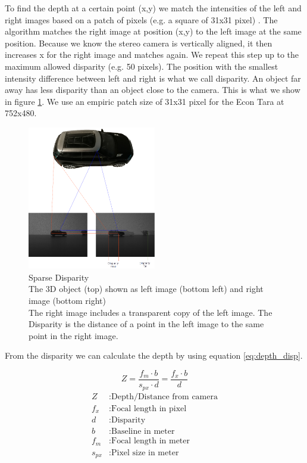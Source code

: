 \documentclass[11pt,a4paper,titlepage,oneside]{report}
\begin{document}
To find the depth at a certain point (x,y) we match the intensities of the left and right images based on a patch of pixels (e.g. a square of 31x31 pixel) \cite{rvc}. The algorithm matches the right image at position (x,y) to the left image at the same position. Because we know the stereo camera is vertically aligned, it then increases x for the right image and matches again. We repeat this step up to the maximum allowed disparity (e.g. 50 pixels). The position with the smallest intensity difference between left and right is what we call disparity. An object far away has less disparity than an object close to the camera. This is what we show in figure \ref{fig:disparity}. We use an empiric patch size of 31x31 pixel for the Econ Tara at 752x480.

\begin{figure}[H]
  \begin{center}
    \includegraphics[width=0.5\textwidth]{img/disparity_concept.png}
  \end{center}
  \caption{Sparse Disparity\\
  The 3D object (top) shown as left image (bottom left) and right image (bottom right)\\
  The right image includes a transparent copy of the left image. The Disparity is the distance of a point in the left image to the same point in the right image.}
  \label{fig:disparity}
\end{figure}

From the disparity we can calculate the depth by using equation \ref{eq:depth_disp}.

\begin{equation}\label{eq:depth_disp}
  Z=\frac{f_m  \cdot  b}{s_{px}  \cdot  d}=\frac{f_x  \cdot  b}{d}
\end{equation}
\begin{align*}
  Z       &: \text{Depth/Distance from camera}\\
  f_x     &: \text{Focal length in pixel}\\
  d       &: \text{Disparity}\\
  b       &: \text{Baseline in meter}\\
  f_m     &: \text{Focal length in meter}\\
  s_{px}  &: \text{Pixel size in meter}
\end{align*}
\end{document}
